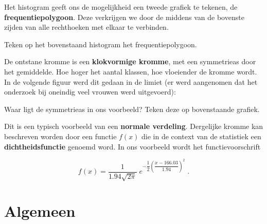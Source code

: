 \documentclass[12pt,twoside]{article}
\begin{document}
{Het histogram geeft ons de mogelijkheid een tweede grafiek te tekenen, de {\bf frequentiepolygoon}. Deze verkrijgen we door de middens van de bovenste zijden van alle rechthoeken met elkaar te verbinden.

\begin{oefening}
Teken op het bovenstaand histogram het frequentiepolygoon.
\end{oefening}

De ontstane kromme is een {\bf klokvormige kromme}, met een symmetrieas door het gemiddelde. Hoe hoger het aantal klassen, hoe vloeiender de kromme wordt. In de volgende figuur werd dit gedaan in de limiet (er werd aangenomen dat het onderzoek bij oneindig veel vrouwen werd uitgevoerd):

\begin{center}
\end{center}

\begin{oefening}
Waar ligt de symmetrieas in ons voorbeeld? \arule{4cm} Teken deze op bovenstaande grafiek.
\end{oefening}

Dit is een typisch voorbeeld van een {\bf normale verdeling}. Dergelijke kromme kan beschreven worden door een functie $f(x)$ die in de context van de statistiek een {\bf dichtheidsfunctie} genoemd word. In ons voorbeeld wordt het functievoorschrift

$$f(x)=\dfrac{1}{1.94\sqrt{2\pi}}\;e^{-\dfrac{1}{2}\left(\dfrac{x-166.03}{1.94}\right)^2}\;.$$

\pagebreak
\section{Algemeen}

}
\end{document}

